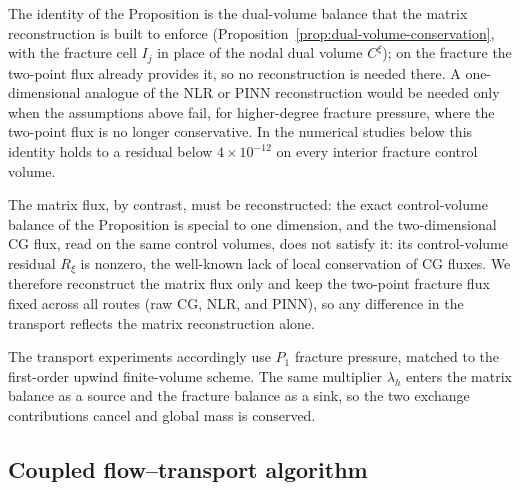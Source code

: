 \documentclass[a4paper,fleqn]{cas-sc}
\begin{document}
The identity of the Proposition is the dual-volume balance that the matrix
reconstruction is built to enforce (Proposition~\ref{prop:dual-volume-conservation},
with the fracture cell \(I_j\) in place of the nodal dual volume \(C^\xi\)); on
the fracture the two-point flux already provides it, so no reconstruction is
needed there. A one-dimensional analogue of the NLR or PINN reconstruction would
be needed only when the assumptions above fail, for higher-degree fracture
pressure, where the two-point flux is no longer conservative. In the numerical
studies below this identity holds to a residual below \(4\times10^{-12}\) on every
interior fracture control volume.

The matrix flux, by contrast, must be reconstructed: the exact control-volume
balance of the Proposition is special to one dimension, and the two-dimensional CG
flux, read on the same control volumes, does not satisfy it: its control-volume
residual \(R_\xi\) is nonzero, the well-known lack of local conservation of CG
fluxes. We therefore reconstruct the matrix flux only and keep the two-point
fracture flux fixed across all routes (raw CG, NLR, and PINN), so any difference
in the transport reflects the matrix reconstruction alone.

The transport experiments accordingly use \(P_1\) fracture pressure, matched to
the first-order upwind finite-volume scheme. The same multiplier \(\lambda_h\)
enters the matrix balance as a source and the fracture balance as a sink, so the
two exchange contributions cancel and global mass is conserved.

\subsection{Coupled flow--transport algorithm}
\label{subsec:method-coupling}
\end{document}
